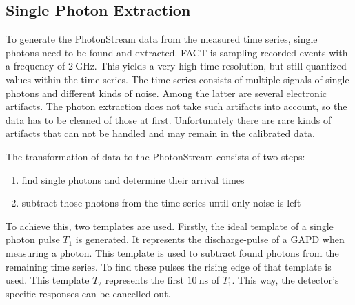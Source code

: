 \subsection{Single Photon Extraction}
%
To generate the PhotonStream data from the measured time series, single photons
need to be found and extracted. FACT is sampling recorded events with a
frequency of $\SI{2}{\giga\hertz}$. This yields a very high time resolution, but still quantized values within the time series. The time series consists of multiple signals
of single photons and different kinds of noise. Among the latter are several
electronic artifacts. The photon extraction does not take such artifacts into
account, so the data has to be cleaned of those at first. Unfortunately there
are rare kinds of artifacts that can not be handled and may remain in the
calibrated data.

The transformation of data to the PhotonStream consists of two steps:
%
\begin{enumerate}
  \item find single photons and determine their arrival times
  \item subtract those photons from the time series until only noise is left
\end{enumerate}
%
To achieve this, two templates are used. Firstly, the ideal template of a
single photon pulse $T_1$ is generated. It represents the discharge-pulse of a
GAPD when measuring a photon. This template is used to subtract found photons
from the remaining time series. To find these pulses the rising edge of that
template is used. This template $T_2$ represents the first
$\SI{10}{\nano\second}$ of $T_1$. This way, the detector's specific responses can be cancelled out.

